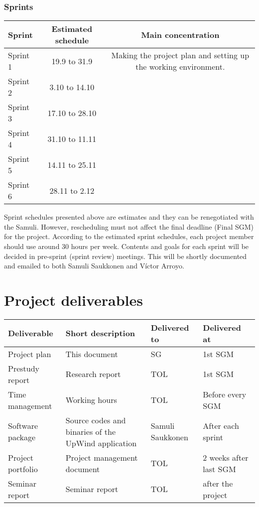 \documentclass[12pt,titlepage]{article}
\begin{document}
		\subsubsection{Sprints}

			\begin{center}
			\begin{tabular}{|l|c|c|}
				\hline
				\textbf{Sprint} & \textbf{Estimated schedule} & \textbf{Main concentration} \\
				\hline
				\hline
				Sprint 1 & 19.9 to 31.9 & Making the project plan and setting up the working environment. \\
				\hline
				Sprint 2 & 3.10 to 14.10 &  \\
				\hline
				Sprint 3 & 17.10 to 28.10 & \\
				\hline
				Sprint 4 & 31.10 to 11.11 & \\
				\hline
				Sprint 5 & 14.11 to 25.11 & \\
				\hline
				Sprint 6 & 28.11 to 2.12 & \\
				\hline
			\end{tabular}
			\end{center}

			Sprint schedules presented above are estimates and they can be renegotiated with the Samuli.
			However, rescheduling must not affect the final deadline (Final SGM) for the project.
			According to the estimated sprint schedules, each project member should use around 30 hours per week.
			Contents and goals for each sprint will be decided in pre-sprint (sprint review) meetings.
			This will be shortly documented and emailed to both Samuli Saukkonen and Víctor Arroyo.

\section{Project deliverables}
			\begin{center}
			\begin{tabular}{|l|p{5cm}|l|l|}
				\hline
				\textbf{Deliverable} & \textbf{Short description} & \textbf{Delivered to} & \textbf{Delivered at}\\
				\hline
				\hline
				Project plan & This document & SG & 1st SGM \\
				\hline
				Prestudy report & Research report & TOL & 1st SGM \\
				\hline
				Time management & Working hours & TOL & Before every SGM\\
				\hline
				Software package & Source codes and binaries of the UpWind application & Samuli Saukkonen & After each sprint\\
				\hline
				Project portfolio & Project management document & TOL & 2 weeks after last SGM \\
				\hline
				Seminar report & Seminar report & TOL & after the project \\
				\hline
			\end{tabular}
			\end{center}
\end{document}

